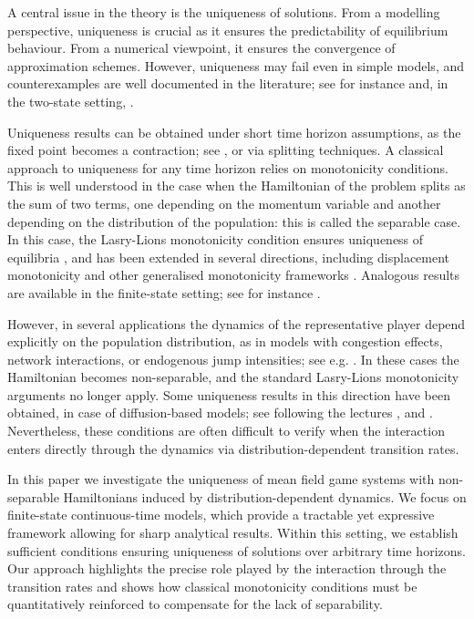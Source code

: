 \documentclass[11pt,a4paper]{amsart}
\theoremstyle{definition}
\begin{document}
A central issue in the theory is the uniqueness of solutions. From a modelling perspective, uniqueness is crucial as it ensures the predictability of equilibrium behaviour. From a numerical viewpoint, it ensures the convergence of approximation schemes. However, uniqueness may fail even in simple models, and counterexamples are well documented in the literature; see for instance \cite{bardi2019non, delarue2020selection} and, in the two-state setting, \cite{cecchin2019convergence, dai2019climb}. 

Uniqueness results can be obtained under short time horizon assumptions, as the fixed point becomes a contraction; see \cite{achdou2021mean, bardi2019non},  or \cite{cardaliaguet2022splitting} via splitting techniques.
%
A classical approach to uniqueness for any time horizon relies on monotonicity conditions. This is well understood in the case when the Hamiltonian of the problem splits as the sum of two terms, one depending on the momentum variable and another depending on the distribution of the population: this is called the separable case.  
In this case, the Lasry-Lions monotonicity condition ensures uniqueness of equilibria \cite{LasryLions, CardaliaguetDelarueLasryLions, mou2024wellposedness}, and has been extended in several directions, including displacement monotonicity \cite{gangbo2022global, meszaros2024mean} and other generalised monotonicity frameworks \cite{graber2023monotonicity, mou2024mean, mou2025second}. Analogous results are available in the finite-state setting; see for instance \cite{bertucci2019some, gomes2013continuous}.

However, in several applications the dynamics of the representative player depend explicitly on the population distribution, as in models with congestion effects, network interactions, or endogenous jump intensities; see e.g. \cite{ghattassi2025, LauriereSongTang2023}. In these cases the Hamiltonian becomes non-separable, and the standard Lasry-Lions monotonicity arguments no longer apply. Some uniqueness results in this direction have been obtained, in case of diffusion-based models; see \cite[Theorem 1.13]{achdou2021mean} following the lectures \cite{Lionscollege2}, and \cite{gangbo2022mean}. Nevertheless, these conditions are often difficult to verify when the interaction enters directly through the dynamics via distribution-dependent transition rates.

In this paper we investigate the uniqueness of mean field game systems with non-separable Hamiltonians induced by distribution-dependent dynamics. We focus on finite-state continuous-time models, which provide a tractable yet expressive framework allowing for sharp analytical results. Within this setting, we establish sufficient conditions ensuring uniqueness of solutions over arbitrary time horizons. Our approach highlights the precise role played by the interaction through the transition rates and shows how classical monotonicity conditions must be quantitatively reinforced to compensate for the lack of separability.
\end{document}
